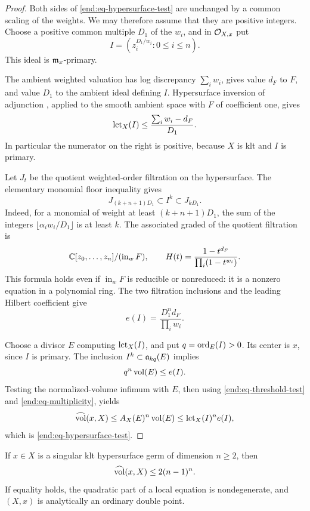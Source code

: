 \begin{proof}
Both sides of \eqref{end:eq-hypersurface-test} are unchanged by
a common scaling of the weights. We may therefore assume
that they are positive integers. Choose a positive common
multiple \(D_1\) of the \(w_i\), and in \(\mathcal O_{X,x}\) put
\[
                       I=(z_i^{D_1/w_i}:0\le i\le n).
\]
This ideal is \(\mathfrak m_x\)-primary.

The ambient weighted valuation has log discrepancy
\(\sum_i w_i\), gives value \(d_F\) to \(F\), and value
\(D_1\) to the ambient ideal defining \(I\). Hypersurface
inversion of adjunction \cite[Theorem~1.1]{EinMustata04}, applied to the smooth ambient
space with \(F\) of coefficient one, gives
\begin{equation}\label{end:eq-threshold-test}
                   \operatorname{lct}_X(I)\le
                   \frac{\sum_i w_i-d_F}{D_1}.
\end{equation}
In particular the numerator on the right is positive,
because \(X\) is klt and \(I\) is primary.

Let \(J_t\) be the quotient weighted-order filtration on
the hypersurface. The elementary monomial floor inequality
gives
\[
                  J_{(k+n+1)D_1}\subset I^k\subset J_{kD_1}.
\]
Indeed, for a monomial of weight at least \((k+n+1)D_1\),
the sum of the integers
\(\lfloor \alpha_i w_i/D_1\rfloor\) is at least \(k\).
The associated graded of the quotient filtration is
\[
 \mathbb C[z_0,\ldots,z_n]/(\operatorname{in}_w F),\qquad
 H(t)=\frac{1-t^{d_F}}{\prod_i(1-t^{w_i})}.
\]
This formula holds even if \(\operatorname{in}_w F\) is
reducible or nonreduced: it is a nonzero equation in a
polynomial ring. The two filtration inclusions and the
leading Hilbert coefficient give
\begin{equation}\label{end:eq-multiplicity}
                       e(I)=\frac{D_1^n d_F}{\prod_i w_i}.
\end{equation}

Choose a divisor \(E\) computing \(\operatorname{lct}_X(I)\), and put
\(q=\operatorname{ord}_E(I)>0\). Its center is \(x\), since \(I\) is
primary. The inclusion \(I^k\subset\mathfrak a_{kq}(E)\) implies
\[
             q^n\operatorname{vol}(E)\le e(I).
\]
Testing the normalized-volume infimum with \(E\), then
using \eqref{end:eq-threshold-test} and
\eqref{end:eq-multiplicity}, yields
\[
 \widehat{\operatorname{vol}}(x,X)\le A_X(E)^n\operatorname{vol}(E)
            \le \operatorname{lct}_X(I)^n e(I),
\]
which is \eqref{end:eq-hypersurface-test}.
\end{proof}

\begin{proposition}\label{end:hypersurface}
If \(x\in X\) is a singular klt hypersurface germ of
dimension \(n\ge2\), then
\[
                        \widehat{\operatorname{vol}}(x,X)\le2(n-1)^n.
\]
If equality holds, the quadratic part of a local equation
is nondegenerate, and \((X,x)\) is analytically an ordinary
double point.
\end{proposition}

